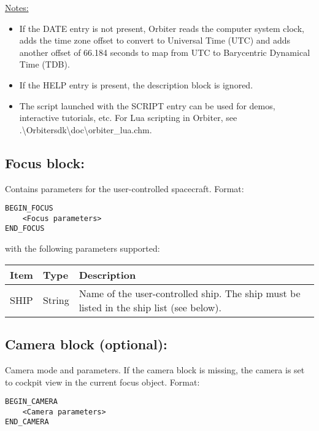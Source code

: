 \documentclass[Orbiter Developer Manual.tex]{subfiles}
\begin{document}
\noindent
\underline{Notes:}

\begin{itemize}
\item If the DATE entry is not present, Orbiter reads the computer system clock, adds the time zone offset to convert to Universal Time (UTC) and adds another offset of 66.184 seconds to map from UTC to Barycentric Dynamical Time (TDB).
\item If the HELP entry is present, the description block is ignored.
\item The script launched with the SCRIPT entry can be used for demos, interactive tutorials, etc. For Lua scripting in Orbiter, see .\textbackslash Orbitersdk\textbackslash doc\textbackslash orbiter\_lua.chm.
\end{itemize}


\subsection*{Focus block:}
Contains parameters for the user-controlled spacecraft. Format:

\begin{lstlisting}[language=OSFS]
BEGIN_FOCUS
	<Focus parameters>
END_FOCUS
\end{lstlisting}

\noindent
with the following parameters supported:

\begin{table}[H]
	\centering
	\begin{tabularx}{\textwidth}{ |l|l|X| }
	\hline\rule{0pt}{2ex}
	\textbf{Item} & \textbf{Type} & \textbf{Description}\\
	\hline\rule{0pt}{2ex}
	SHIP & String & Name of the user-controlled ship. The ship must be listed in the ship list (see below).\\
	\hline
	\end{tabularx}
\end{table}

\subsection*{Camera block (optional):}

Camera mode and parameters. If the camera block is missing, the camera is set to cockpit view in the current focus object. Format:

\begin{lstlisting}[language=OSFS]
BEGIN_CAMERA
	<Camera parameters>
END_CAMERA
\end{lstlisting}
\end{document}
